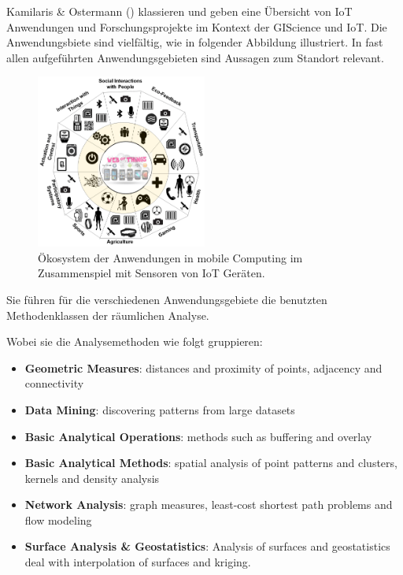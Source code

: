\documentclass[
  11pt,
  a4paperpaper,
  oneside, openany  ,captions=tableheading
]{scrbook}
\providecommand{\tightlist}{%
  \setlength{\itemsep}{0pt}\setlength{\parskip}{0pt}}
\theoremstyle{definition}
\theoremstyle{remark}
\begin{document}
Kamilaris \& Ostermann () klassieren
und geben eine Übersicht von IoT Anwendungen und
Forschungsprojekte im Kontext der GIScience und IoT. Die Anwendungsbiete
sind vielfältig, wie in folgender Abbildung illustriert. In fast allen
aufgeführten Anwendungsgebieten sind Aussagen zum Standort relevant.

\begin{figure}[H]

{\centering \includegraphics[width=0.5\textwidth,height=\textheight]{images/iot_ecosystem_mobile.png}

}

\caption{Ökosystem der Anwendungen in mobile Computing im Zusammenspiel
mit Sensoren von IoT Geräten.}

\end{figure}%

Sie führen für die verschiedenen Anwendungsgebiete die benutzten
Methodenklassen der räumlichen Analyse.

Wobei sie die Analysemethoden wie folgt gruppieren:

\begin{itemize}
\tightlist
\item
  \textbf{Geometric Measures}: distances and proximity of points,
  adjacency and connectivity
\item
  \textbf{Data Mining}: discovering patterns from large datasets
\item
  \textbf{Basic Analytical Operations}: methods such as buffering and
  overlay
\item
  \textbf{Basic Analytical Methods}: spatial analysis of point patterns
  and clusters, kernels and density analysis
\item
  \textbf{Network Analysis}: graph measures, least-cost shortest path
  problems and flow modeling
\item
  \textbf{Surface Analysis \& Geostatistics}: Analysis of surfaces and
  geostatistics deal with interpolation of surfaces and kriging.
\end{itemize}
\end{document}
